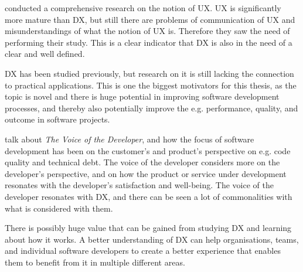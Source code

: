 \documentclass[english, 12pt, a4paper, sci, utf8, a-1b, online]{aaltothesis}
\begin{document}
\cite{understanding-ux} conducted a comprehensive research on the notion of UX. UX is significantly more mature than DX, but still there are problems of communication of UX and misunderstandings of what the notion of UX is. Therefore they saw the need of performing their study. This is a clear indicator that DX is also in the need of a clear and well defined.

DX has been studied previously, but research on it is still lacking the connection to practical applications. This is one the biggest motivators for this thesis, as the topic is novel and there is huge potential in improving software development processes, and thereby also potentially improve the e.g. performance, quality, and outcome in software projects.

\cite{voice-of-the-developer} talk about \textit{The Voice of the Developer}, and how the focus of software development has been on the customer's and product's perspective on e.g. code quality and technical debt. The voice of the developer considers more on the developer's perspective, and on how the product or service under development resonates with the developer's satisfaction and well-being. The voice of the developer resonates with DX, and there can be seen a lot of commonalities with what is considered with them.

There is possibly huge value that can be gained from studying DX and learning about how it works. A better understanding of DX can help organisations, teams, and individual software developers to create a better experience that enables them to benefit from it in multiple different areas.

\end{document}
